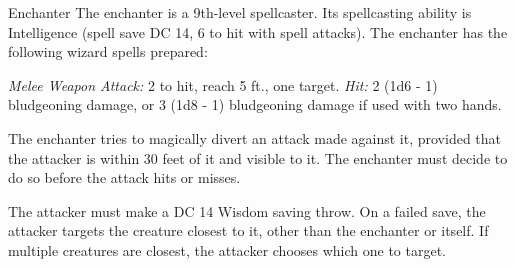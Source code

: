 \documentclass[10pt,a4paper,twoside,bg=print,twocolumn,openany,nodeprecatedcode]{dndbook}
\begin{document}
\begin{DndMonster}[float=t]{Enchanter}
\DndMonsterBasics[
armor-class = {12 (15 with \textit{mage armor})},
hit-points = {\DndDice{9d8}},
speed = {30 ft.}
]
\DndMonsterAbilityScores[
 str = 9,
 dex = 14,
 con = 11,
 int = 17,
 wis = 12,
 cha = 11
]
\DndMonsterDetails[
saving-throws = {Int +6, Wis +4},
skills = {Arcana +6, History +6},
languages = {any four languages},
challenge = 5,
]
The enchanter is a 9th-level spellcaster. Its spellcasting ability is Intelligence (spell save DC 14, 6 to hit with spell attacks). The enchanter has the following wizard spells prepared:
\begin{DndMonsterSpells}
\end{DndMonsterSpells}
\textsl{Melee Weapon Attack:} 2 to hit, reach 5 ft., one target. \textsl{Hit:} 2 (1d6 - 1) bludgeoning damage, or 3 (1d8 - 1) bludgeoning damage if used with two hands.

The enchanter tries to magically divert an attack made against it, provided that the attacker is within 30 feet of it and visible to it. The enchanter must decide to do so before the attack hits or misses.

The attacker must make a DC 14 Wisdom saving throw. On a failed save, the attacker targets the creature closest to it, other than the enchanter or itself. If multiple creatures are closest, the attacker chooses which one to target.

\end{DndMonster}
\end{document}
